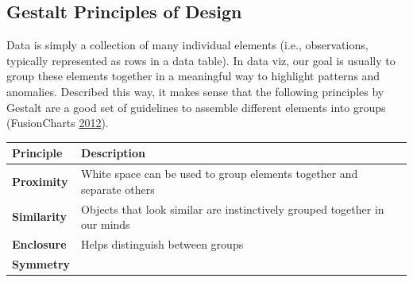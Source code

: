 \documentclass[]{book}
\begin{document}
\subsection{Gestalt Principles of
Design}\label{gestalt-principles-of-design}

Data is simply a collection of many individual elements (i.e.,
observations, typically represented as rows in a data table). In data
viz, our goal is usually to group these elements together in a
meaningful way to highlight patterns and anomalies. Described this way,
it makes sense that the following principles by Gestalt are a good set
of guidelines to assemble different elements into groups (FusionCharts
\protect\hyperlink{ref-principles-fusioncharts}{2012}).

\begin{longtable}[]{@{}ll@{}}
\toprule
\begin{minipage}[b]{0.16\columnwidth}\raggedright\strut
\textbf{Principle}\strut
\end{minipage} & \begin{minipage}[b]{0.78\columnwidth}\raggedright\strut
\textbf{Description}\strut
\end{minipage}\tabularnewline
\midrule
\endhead
\begin{minipage}[t]{0.16\columnwidth}\raggedright\strut
\textbf{Proximity}\strut
\end{minipage} & \begin{minipage}[t]{0.78\columnwidth}\raggedright\strut
White space can be used to group elements together and separate
others\strut
\end{minipage}\tabularnewline
\begin{minipage}[t]{0.16\columnwidth}\raggedright\strut
\textbf{Similarity}\strut
\end{minipage} & \begin{minipage}[t]{0.78\columnwidth}\raggedright\strut
Objects that look similar are instinctively grouped together in our
minds\strut
\end{minipage}\tabularnewline
\begin{minipage}[t]{0.16\columnwidth}\raggedright\strut
\textbf{Enclosure}\strut
\end{minipage} & \begin{minipage}[t]{0.78\columnwidth}\raggedright\strut
Helps distinguish between groups\strut
\end{minipage}\tabularnewline
\begin{minipage}[t]{0.16\columnwidth}\raggedright\strut
\textbf{Symmetry}\strut

\end{minipage}
\end{longtable}
\end{document}
